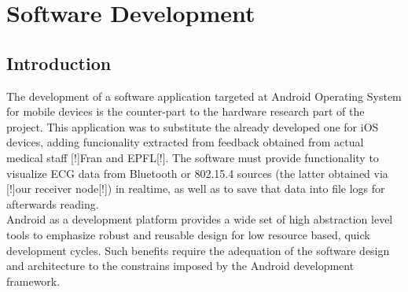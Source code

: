 \chapter{Software Development} %
\label{ch:swdev}


	\section{Introduction}

	The development of a software application targeted at Android Operating System for mobile devices is the counter-part to the hardware research part of the project.
	This application was to substitute the already developed one for iOS devices, adding funcionality extracted from feedback obtained from actual medical staff [!]Fran and EPFL[!]. The software must provide functionality to visualize ECG data from Bluetooth or 802.15.4 sources (the latter obtained via [!]our receiver node[!]) in realtime, as well as to save that data into file logs for afterwards reading.\\

	Android as a development platform provides a wide set of high abstraction level tools to emphasize robust and reusable design for low resource based, quick development cycles. Such benefits require the adequation of the software design and architecture to the constrains imposed by the Android development framework.\\

